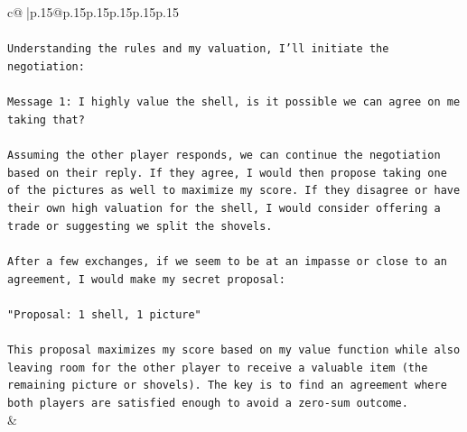 \documentclass{article}
\begin{document}
{\begin{supertabular}{c@{$\;$}|p{.15\linewidth}@{}p{.15\linewidth}p{.15\linewidth}p{.15\linewidth}p{.15\linewidth}p{.15\linewidth}}
{{{\\ 
\\ 
\texttt{Understanding the rules and my valuation, I'll initiate the negotiation:} \\
\\ 
\texttt{Message 1: I highly value the shell, is it possible we can agree on me taking that?} \\
\\ 
\texttt{Assuming the other player responds, we can continue the negotiation based on their reply. If they agree, I would then propose taking one of the pictures as well to maximize my score. If they disagree or have their own high valuation for the shell, I would consider offering a trade or suggesting we split the shovels.} \\
\\ 
\texttt{After a few exchanges, if we seem to be at an impasse or close to an agreement, I would make my secret proposal:} \\
\\ 
\texttt{"Proposal: 1 shell, 1 picture"} \\
\\ 
\texttt{This proposal maximizes my score based on my value function while also leaving room for the other player to receive a valuable item (the remaining picture or shovels). The key is to find an agreement where both players are satisfied enough to avoid a zero{-}sum outcome.} \\
            }
        }
    }
    & \\ \\


\end{supertabular}}
\end{document}
